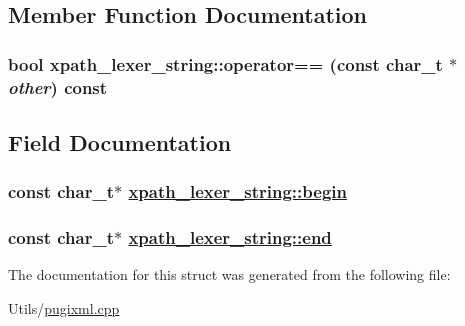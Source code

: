 \subsection{Member Function Documentation}
\hypertarget{structxpath__lexer__string_c19adfd75832be8eff3f430aa3cb3c14}{
\subsubsection[operator==]{\setlength{\rightskip}{0pt plus 5cm}bool xpath\_\-lexer\_\-string::operator== (const char\_\-t $\ast$ {\em other}) const}}
\label{structxpath__lexer__string_c19adfd75832be8eff3f430aa3cb3c14}




\subsection{Field Documentation}
\hypertarget{structxpath__lexer__string_0b985863d7363a75d4fdd0a7ece1fca0}{
\subsubsection[begin]{\setlength{\rightskip}{0pt plus 5cm}const char\_\-t$\ast$ \hyperlink{structxpath__lexer__string_0b985863d7363a75d4fdd0a7ece1fca0}{xpath\_\-lexer\_\-string::begin}}}
\label{structxpath__lexer__string_0b985863d7363a75d4fdd0a7ece1fca0}


\hypertarget{structxpath__lexer__string_13bbedeca2f8c2fb1e294325eea66878}{
\subsubsection[end]{\setlength{\rightskip}{0pt plus 5cm}const char\_\-t$\ast$ \hyperlink{structxpath__lexer__string_13bbedeca2f8c2fb1e294325eea66878}{xpath\_\-lexer\_\-string::end}}}
\label{structxpath__lexer__string_13bbedeca2f8c2fb1e294325eea66878}




The documentation for this struct was generated from the following file:\begin{CompactItemize}
\item 
Utils/\hyperlink{pugixml_8cpp}{pugixml.cpp}\end{CompactItemize}
